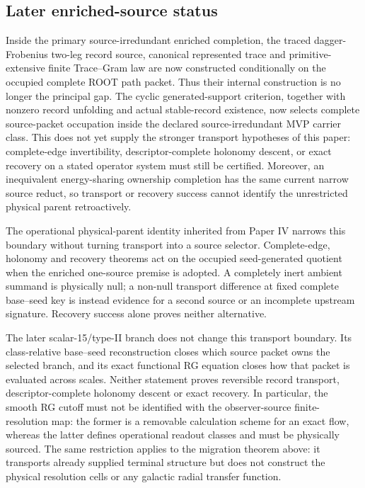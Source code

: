 \documentclass[11pt]{article}
\begin{document}
\subsection{Later enriched-source status}

Inside the primary source-irredundant enriched completion, the traced
dagger-Frobenius two-leg record source, canonical represented trace and
primitive-extensive finite Trace--Gram law are now constructed conditionally
on the occupied complete ROOT path packet. Thus their internal construction is
no longer the principal gap. The cyclic generated-support criterion, together
with nonzero record unfolding and actual stable-record existence, now selects
complete source-packet occupation inside the declared source-irredundant MVP
carrier class. This does not yet supply the stronger transport hypotheses of
this paper: complete-edge invertibility, descriptor-complete holonomy descent,
or exact recovery on a stated operator system must still be certified.
Moreover, an inequivalent energy-sharing ownership completion has the same
current narrow source reduct, so transport or recovery success cannot identify
the unrestricted physical parent retroactively.

The operational physical-parent identity inherited from Paper IV narrows this
boundary without turning transport into a source selector. Complete-edge,
holonomy and recovery theorems act on the occupied seed-generated quotient
when the enriched one-source premise is adopted. A completely inert ambient
summand is physically null; a non-null transport difference at fixed complete
base--seed key is instead evidence for a second source or an incomplete
upstream signature. Recovery success alone proves neither alternative.

The later scalar-15/type-II branch does not change this transport boundary.
Its class-relative base--seed reconstruction closes which source packet owns
the selected branch, and its exact functional RG equation closes how that
packet is evaluated across scales.  Neither statement proves reversible
record transport, descriptor-complete holonomy descent or exact recovery.
In particular, the smooth RG cutoff must not be identified with the
observer-source finite-resolution map: the former is a removable calculation
scheme for an exact flow, whereas the latter defines operational readout
classes and must be physically sourced.
The same restriction applies to the migration theorem above: it transports
already supplied terminal structure but does not construct the physical
resolution cells or any galactic radial transfer function.
\end{document}
